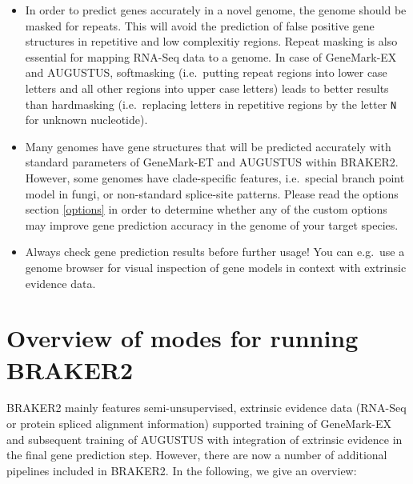 \documentclass[a4paper,10pt]{report}
\begin{document}
\begin{itemize}
 \item In order to predict genes accurately in a novel genome, the genome should be masked for repeats. This will avoid the prediction of false positive gene structures in repetitive and low complexitiy regions. Repeat masking is also essential for mapping RNA-Seq data to a genome. In case of GeneMark-EX and AUGUSTUS, softmasking (i.e.~putting repeat regions into lower case letters and all other regions into upper case letters) leads to better results than hardmasking (i.e.~replacing letters in repetitive regions by the letter \texttt{N} for unknown nucleotide).
 
 \item Many genomes have gene structures that will be predicted accurately with standard parameters of GeneMark-ET and AUGUSTUS within BRAKER2. However, some genomes have clade-specific features, i.e.~special branch point model in fungi, or non-standard splice-site patterns. Please read the options section \ref{options} in order to determine whether any of the custom options may improve gene prediction accuracy in the genome of your target species.
 
 \item Always check gene prediction results before further usage! You can e.g.~use a genome browser for visual inspection of gene models in context with extrinsic evidence data.
\end{itemize}

\section{Overview of modes for running BRAKER2}

BRAKER2 mainly features semi-unsupervised, extrinsic evidence data (RNA-Seq or protein spliced alignment information) supported training of GeneMark-EX and subsequent training of AUGUSTUS with integration of extrinsic evidence in the final gene prediction step. However, there are now a number of additional pipelines included in BRAKER2. In the following, we give an overview:
\end{document}
